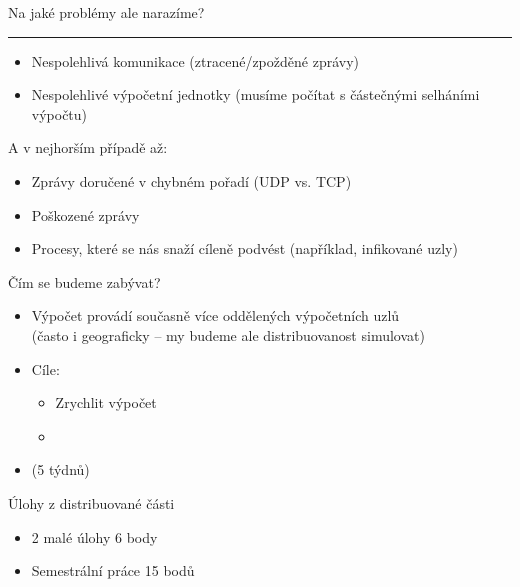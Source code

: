\documentclass[usenames,dvipsnames,9pt]{beamer}
\begin{document}
\begin{frame}

  \begin{center}
    \LARGE Na jaké problémy ale narazíme?
  \end{center}

  \pause\vspace{1em}\hrule\vspace{1em}

  \begin{itemize}
    \item Nespolehlivá komunikace (ztracené/zpožděné zprávy)
    \item Nespolehlivé výpočetní jednotky (musíme počítat s částečnými selháními výpočtu)
  \end{itemize}

  \pause\vspace{0.8em}
  A v nejhorším případě až:
  \begin{itemize}
    \item Zprávy doručené v chybném pořadí (UDP vs. TCP)
    \item Poškozené zprávy
    \item Procesy, které se nás snaží cíleně podvést (například, infikované uzly)
  \end{itemize}

\end{frame}


\begin{frame}
\begin{block}{Čím se budeme zabývat?}
      \begin{itemize}
        \item Výpočet provádí současně více oddělených výpočetních uzlů\\
              {\small (často i geograficky -- my budeme ale distribuovanost simulovat)} \\[1em]
        \item Cíle:
              \begin{itemize}
                \item Zrychlit výpočet
                \item {}
              \end{itemize}\vspace{1em}
        \item {\small (5 týdnů)}
      \end{itemize}
    \end{block}

  \begin{block}{Úlohy z distribuované části}
    \begin{itemize}
      \item 2 malé úlohy                 \hfill  6 body
      \item Semestrální práce            \hfill 15 bodů
    \end{itemize}
  \end{block}
\end{frame}
\end{document}

